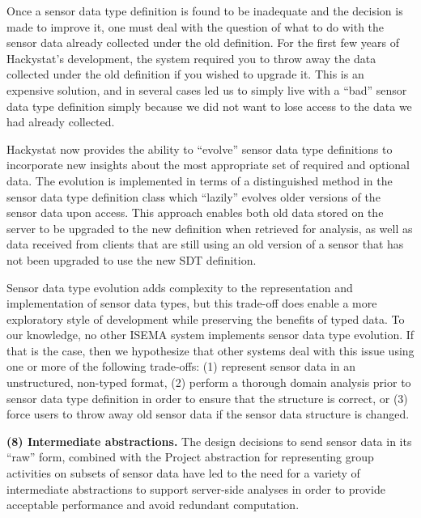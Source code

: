 \documentclass[10pt,twocolumn]{article}
\begin{document}
Once a sensor data type definition is found to be inadequate and the
decision is made to improve it, one must deal with the question of what to
do with the sensor data already collected under the old definition.  For
the first few years of Hackystat's development, the system required you to
throw away the data collected under the old definition if you wished to
upgrade it.  This is an expensive solution, and in several cases led us to
simply live with a ``bad'' sensor data type definition simply because we
did not want to lose access to the data we had already collected.

Hackystat now provides the ability to ``evolve'' sensor data type
definitions to incorporate new insights about the most appropriate set of
required and optional data.  The evolution is implemented in terms of a
distinguished method in the sensor data type definition class which ``lazily'' 
evolves older versions of the sensor data upon access. This approach 
enables both old data stored on the server to be upgraded to the new
definition when retrieved for analysis, as well as data received from
clients that are still using an old version of a sensor that has not been
upgraded to use the new SDT definition.  

Sensor data type evolution adds complexity to the representation and
implementation of sensor data types, but this trade-off does enable a more
exploratory style of development while preserving the benefits of typed
data.  To our knowledge, no other ISEMA system implements sensor data type
evolution. If that is the case, then we hypothesize that other systems deal
with this issue using one or more of the following trade-offs: (1)
represent sensor data in an unstructured, non-typed format, (2) perform a
thorough domain analysis prior to sensor data type definition in order to
ensure that the structure is correct, or (3) force users to throw away old
sensor data if the sensor data structure is changed.

{\bf (8) Intermediate abstractions.} The design decisions to send sensor data
in its ``raw'' form, combined with the Project abstraction for representing
group activities on subsets of sensor data have led to the need for a
variety of intermediate abstractions to support server-side analyses in order
to provide acceptable performance and avoid redundant computation. 
\end{document}
